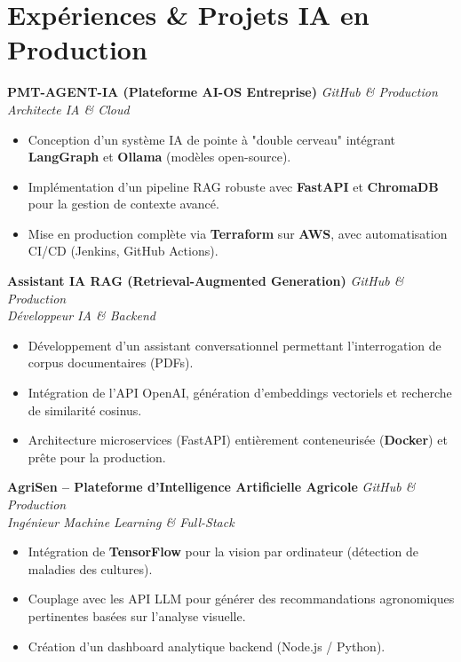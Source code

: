\documentclass[10pt,a4paper]{article}
\begin{document}
\section*{Expériences \& Projets IA en Production}

\textbf{\color{dark} PMT-AGENT-IA (Plateforme AI-OS Entreprise)} \hfill \textit{GitHub \& Production}\\
\textit{Architecte IA \& Cloud}
\begin{itemize}[leftmargin=0.5cm, label={--}, itemsep=1pt]
    \item Conception d'un système IA de pointe à "double cerveau" intégrant \textbf{LangGraph} et \textbf{Ollama} (modèles open-source).
    \item Implémentation d'un pipeline RAG robuste avec \textbf{FastAPI} et \textbf{ChromaDB} pour la gestion de contexte avancé.
    \item Mise en production complète via \textbf{Terraform} sur \textbf{AWS}, avec automatisation CI/CD (Jenkins, GitHub Actions).
\end{itemize}

\vspace{0.2cm}

\textbf{\color{dark} Assistant IA RAG (Retrieval-Augmented Generation)} \hfill \textit{GitHub \& Production}\\
\textit{Développeur IA \& Backend}
\begin{itemize}[leftmargin=0.5cm, label={--}, itemsep=1pt]
    \item Développement d'un assistant conversationnel permettant l'interrogation de corpus documentaires (PDFs).
    \item Intégration de l'API OpenAI, génération d'embeddings vectoriels et recherche de similarité cosinus.
    \item Architecture microservices (FastAPI) entièrement conteneurisée (\textbf{Docker}) et prête pour la production.
\end{itemize}

\vspace{0.2cm}

\textbf{\color{dark} AgriSen -- Plateforme d'Intelligence Artificielle Agricole} \hfill \textit{GitHub \& Production}\\
\textit{Ingénieur Machine Learning \& Full-Stack}
\begin{itemize}[leftmargin=0.5cm, label={--}, itemsep=1pt]
    \item Intégration de \textbf{TensorFlow} pour la vision par ordinateur (détection de maladies des cultures).
    \item Couplage avec les API LLM pour générer des recommandations agronomiques pertinentes basées sur l'analyse visuelle.
    \item Création d'un dashboard analytique backend (Node.js / Python).
\end{itemize}
\end{document}
